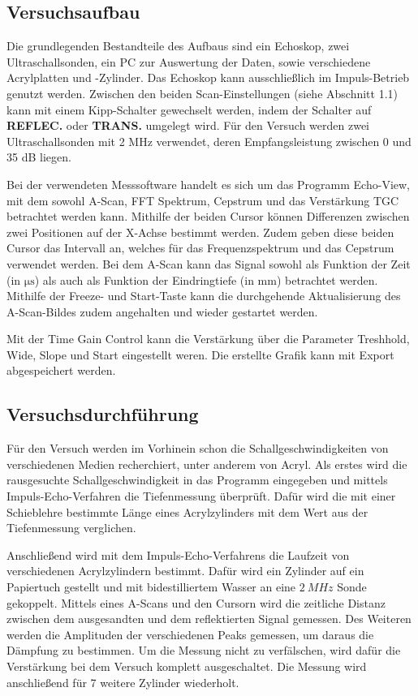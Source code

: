 \subsection{Versuchsaufbau}

Die grundlegenden Bestandteile des Aufbaus sind ein Echoskop, zwei Ultraschallsonden,
ein PC zur Auswertung der Daten, sowie verschiedene Acrylplatten und -Zylinder.
Das Echoskop kann ausschließlich im Impuls-Betrieb genutzt werden. Zwischen den
beiden Scan-Einstellungen (siehe Abschnitt 1.1) kann mit einem Kipp-Schalter
gewechselt werden, indem der Schalter auf \textbf{REFLEC.} oder \textbf{TRANS.}
umgelegt wird. Für den Versuch werden zwei Ultraschallsonden mit 2 MHz verwendet,
deren Empfangsleistung zwischen 0 und 35 dB liegen.

Bei der verwendeten Messsoftware handelt es sich um das Programm Echo-View, mit
dem sowohl A-Scan, FFT Spektrum, Cepstrum und das Verstärkung TGC betrachtet
werden kann. Mithilfe der beiden Cursor können Differenzen zwischen zwei Positionen
auf der X-Achse bestimmt werden. Zudem geben diese beiden Cursor das Intervall
an, welches für das Frequenzspektrum und das Cepstrum verwendet werden.
Bei dem A-Scan kann das Signal sowohl als Funktion der Zeit (in $\si{\micro\second}$)
als auch als Funktion der Eindringtiefe (in mm) betrachtet werden. Mithilfe der
Freeze- und Start-Taste kann die durchgehende Aktualisierung des A-Scan-Bildes
zudem angehalten und wieder gestartet werden.

Mit der Time Gain Control kann die Verstärkung über die Parameter Treshhold, Wide,
Slope und Start eingestellt weren. Die erstellte Grafik kann mit Export abgespeichert
werden.


\subsection{Versuchsdurchführung}

Für den Versuch werden im Vorhinein schon die Schallgeschwindigkeiten von verschiedenen
Medien recherchiert, unter anderem von Acryl. Als erstes wird die rausgesuchte
Schallgeschwindigkeit in das Programm eingegeben und mittels
Impuls-Echo-Verfahren die Tiefenmessung überprüft.
Dafür wird die mit einer Schieblehre bestimmte Länge eines Acrylzylinders
mit dem Wert aus der Tiefenmessung verglichen.

Anschließend wird mit dem Impuls-Echo-Verfahrens die Laufzeit von verschiedenen
Acrylzylindern bestimmt. Dafür wird ein Zylinder auf ein Papiertuch gestellt und
mit bidestilliertem Wasser an eine $\SI{2}{MHz}$ Sonde gekoppelt. Mittels eines
A-Scans und den Cursorn wird die zeitliche Distanz zwischen dem ausgesandten und
dem reflektierten Signal gemessen.
Des Weiteren werden die Amplituden der verschiedenen Peaks gemessen, um
daraus die Dämpfung zu bestimmen. Um die Messung nicht zu verfälschen, wird dafür
die Verstärkung bei dem Versuch komplett ausgeschaltet. Die Messung wird anschließend
für 7 weitere Zylinder wiederholt.

